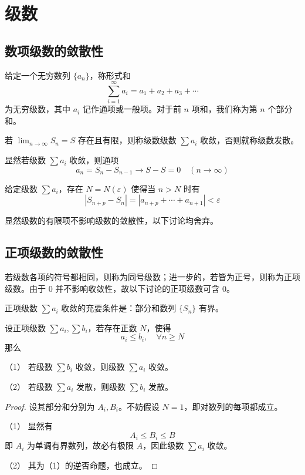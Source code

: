 \chapter{级数}

\section{数项级数的敛散性}

给定一个无穷数列 $\{a_n\}$，称形式和
\[ \sum_{i=1}^\infty a_i = a_1 + a_2 + a_3 + \cdots \]
为无穷级数，其中 $a_i$ 记作通项或一般项。对于前 $n$ 项和，我们称为第 $n$ 个部分和。

若 $\lim_{n \to \infty} S_n = S$ 存在且有限，则称级数级数 $\sum a_i$ 收敛，否则就称级数发散。

显然若级数 $\sum a_i$ 收敛，则通项
\[ a_n = S_n - S_{n-1} \to S - S = 0 \quad(n \to \infty) \]

\begin{theorem}[Cauchy 准则]
	给定级数 $\sum a_i$，存在 $N = N(\varepsilon)$ 使得当 $n > N$ 时有
	\[ |S_{n+p} - S_{n}| = |a_{n+p} + \cdots + a_{n+1}| < \varepsilon \]
\end{theorem}

显然级数的有限项不影响级数的敛散性，以下讨论均舍弃。

\section{正项级数的敛散性}

若级数各项的符号都相同，则称为同号级数；进一步的，若皆为正号，则称为正项级数。由于 $0$ 并不影响收敛性，故以下讨论的正项级数可含 $0$。

\begin{theorem}[基本判别法]
	正项级数 $\sum a_i$ 收敛的充要条件是：部分和数列 $\{S_n\}$ 有界。
\end{theorem}

\begin{theorem}[比较原则]
	设正项级数 $\sum a_i, \sum b_i$，若存在正数 $N$，使得
	\[ a_i \leqslant b_i, \quad \forall n \geqslant N \]
	那么

	（1） 若级数 $\sum b_i$ 收敛，则级数 $\sum a_i$ 收敛。

	（2） 若级数 $\sum a_i$ 发散，则级数 $\sum b_i$ 发散。
\end{theorem}

\begin{proof}
	设其部分和分别为 $A_i, B_i$。不妨假设 $N=1$，即对数列的每项都成立。

	（1） 显然有
	\[ A_i \leqslant B_i \leqslant B \]
	即 $A_i$ 为单调有界数列，故必有极限 $A$，因此级数 $\sum a_i$ 收敛。

	（2） 其为（1）的逆否命题，也成立。
\end{proof}


